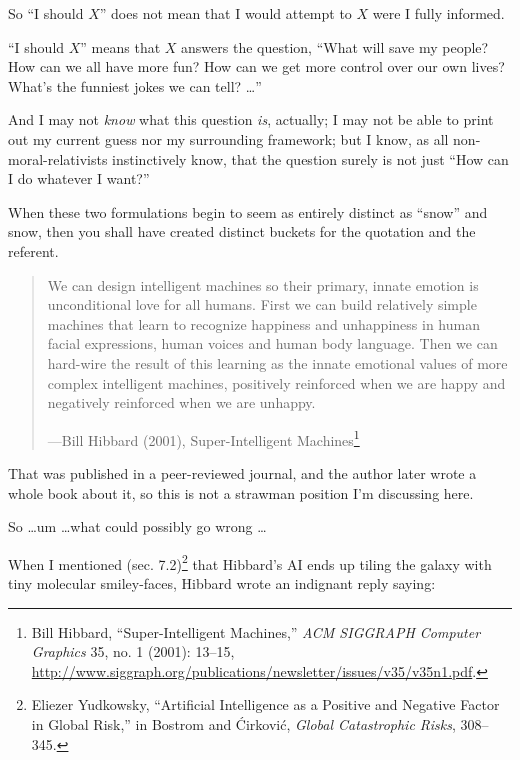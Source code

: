 {
 So ``I should $X$'' does not mean
that I would attempt to $X$ were I fully informed.}

{
 ``I should $X$'' means that $X$
answers the question, ``What will save my people? How
can we all have more fun? How can we get more control over our own
lives? What's the funniest jokes we can tell?
\ldots''}

{
 And I may not \textit{know} what this question \textit{is},
actually; I may not be able to print out my current guess nor my
surrounding framework; but I know, as all non-moral-relativists
instinctively know, that the question surely is not just
``How can I do whatever I want?''}

{
 When these two formulations begin to seem as entirely distinct as
``snow'' and snow, then you shall
have created distinct buckets for the quotation and the referent.}

\myendsectiontext


\begin{quote}
{
 We can design intelligent machines so their primary, innate
emotion is unconditional love for all humans. First we can build
relatively simple machines that learn to recognize happiness and
unhappiness in human facial expressions, human voices and human body
language. Then we can hard-wire the result of this learning as the
innate emotional values of more complex intelligent machines,
positively reinforced when we are happy and negatively reinforced when
we are unhappy.}

{\raggedleft
 {}---Bill Hibbard (2001), Super-Intelligent
Machines\footnote{Bill Hibbard, ``Super-Intelligent
Machines,'' \textit{ACM SIGGRAPH Computer Graphics}
35, no. 1 (2001): 13--15,
\url{http://www.siggraph.org/publications/newsletter/issues/v35/v35n1.pdf}.}
\par}
\end{quote}


{
 That was published in a peer-reviewed journal, and the author
later wrote a whole book about it, so this is not a strawman position
I'm discussing here.}

{
 So \ldots um \ldots what could possibly go wrong \ldots}

{
 When I mentioned (sec. 7.2)\footnote{Eliezer Yudkowsky, ``Artificial Intelligence
as a Positive and Negative Factor in Global Risk,''
in Bostrom and \'Cirkovi\'c, \textit{Global Catastrophic Risks},
308--345.} that
Hibbard's AI ends up tiling the galaxy with tiny
molecular smiley-faces, Hibbard wrote an indignant reply saying:}

